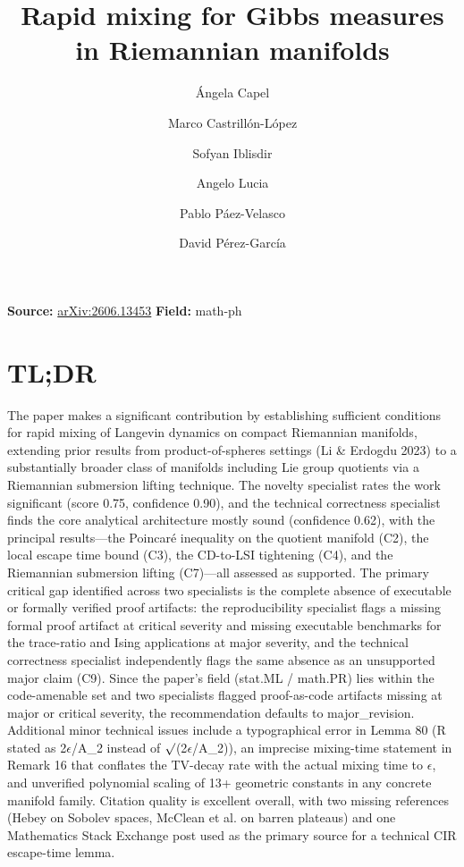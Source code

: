 \documentclass[11pt]{article}
\title{Rapid mixing for Gibbs measures in Riemannian manifolds}
\author{Ángela Capel \and Marco Castrillón-López \and Sofyan Iblisdir \and Angelo Lucia \and Pablo Páez-Velasco \and David Pérez-García}
\date{}
\begin{document}
\maketitle

\noindent\textbf{Source:} \href{https://arxiv.org/abs/2606.13453}{arXiv:2606.13453} \quad \textbf{Field:} math-ph\\

\section*{TL;DR}
The paper makes a significant contribution by establishing sufficient conditions for rapid mixing of Langevin dynamics on compact Riemannian manifolds, extending prior results from product-of-spheres settings (Li \& Erdogdu 2023) to a substantially broader class of manifolds including Lie group quotients via a Riemannian submersion lifting technique. The novelty specialist rates the work significant (score 0.75, confidence 0.90), and the technical correctness specialist finds the core analytical architecture mostly sound (confidence 0.62), with the principal results---the Poincaré inequality on the quotient manifold (C2), the local escape time bound (C3), the CD-to-LSI tightening (C4), and the Riemannian submersion lifting (C7)---all assessed as supported. The primary critical gap identified across two specialists is the complete absence of executable or formally verified proof artifacts: the reproducibility specialist flags a missing formal proof artifact at critical severity and missing executable benchmarks for the trace-ratio and Ising applications at major severity, and the technical correctness specialist independently flags the same absence as an unsupported major claim (C9). Since the paper's field (stat.ML / math.PR) lies within the code-amenable set and two specialists flagged proof-as-code artifacts missing at major or critical severity, the recommendation defaults to major\_revision. Additional minor technical issues include a typographical error in Lemma 80 (R stated as 2\ensuremath{\epsilon}/A\_2 instead of \ensuremath{\surd}(2\ensuremath{\epsilon}/A\_2)), an imprecise mixing-time statement in Remark 16 that conflates the TV-decay rate with the actual mixing time to \ensuremath{\epsilon}, and unverified polynomial scaling of 13+ geometric constants in any concrete manifold family. Citation quality is excellent overall, with two missing references (Hebey on Sobolev spaces, McClean et al. on barren plateaus) and one Mathematics Stack Exchange post used as the primary source for a technical CIR escape-time lemma.
\end{document}
